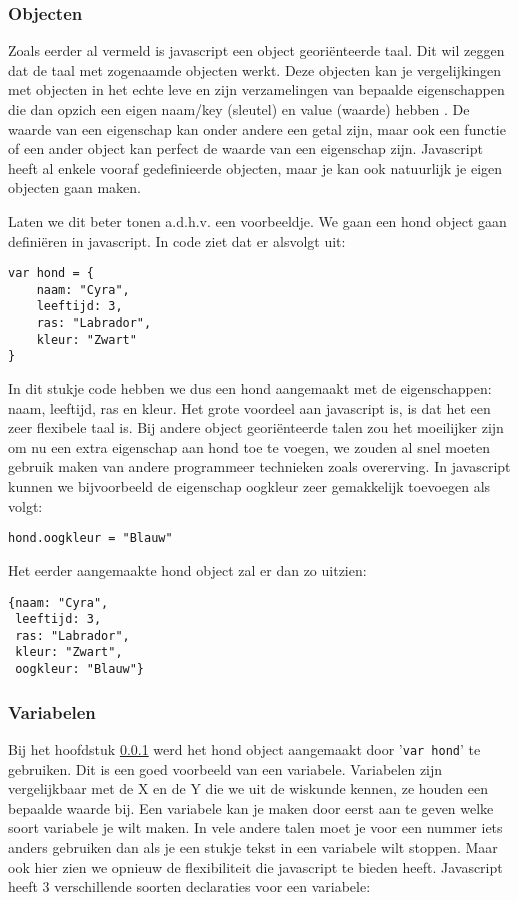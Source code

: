 \subsubsection{Objecten}
\label{sssec:objecten}
Zoals eerder al vermeld is javascript een object georiënteerde taal. Dit wil zeggen dat de taal met zogenaamde objecten werkt. Deze objecten kan je vergelijkingen met objecten in het echte leve en zijn verzamelingen van bepaalde eigenschappen die dan opzich een eigen naam/key (sleutel) en value (waarde) hebben \autocite{Mozilla2018}. De waarde van een eigenschap kan onder andere een getal zijn, maar ook een functie of een ander object kan perfect de waarde van een eigenschap zijn. Javascript heeft al enkele vooraf gedefinieerde objecten, maar je kan ook natuurlijk je eigen objecten gaan maken.

Laten we dit beter tonen a.d.h.v. een voorbeeldje. We gaan een hond object gaan definiëren in javascript. In code ziet dat er alsvolgt uit:

\begin{lstlisting}[frame=single]
var hond = {
	naam: "Cyra",
	leeftijd: 3,
	ras: "Labrador",
	kleur: "Zwart"
}
\end{lstlisting}

In dit stukje code hebben we dus een hond aangemaakt met de eigenschappen: naam, leeftijd, ras en kleur. Het grote voordeel aan javascript is, is dat het een zeer flexibele taal is. Bij andere object georiënteerde talen zou het moeilijker zijn om nu een extra eigenschap aan hond toe te voegen, we zouden al snel moeten gebruik maken van andere programmeer technieken zoals overerving. In javascript kunnen we bijvoorbeeld de eigenschap oogkleur zeer gemakkelijk toevoegen als volgt:

\begin{lstlisting}[frame=single]
hond.oogkleur = "Blauw"
\end{lstlisting}

Het eerder aangemaakte hond object zal er dan zo uitzien:

\begin{lstlisting}[frame=single]
{naam: "Cyra",
 leeftijd: 3,
 ras: "Labrador",
 kleur: "Zwart",
 oogkleur: "Blauw"}
\end{lstlisting}

\subsubsection{Variabelen}
\label{sssec:variabelen}
Bij het hoofdstuk \ref{sssec:objecten} werd het hond object aangemaakt door '\lstinline[basicstyle=\ttfamily\color{red}]|var hond|' te gebruiken. Dit is een goed voorbeeld van een variabele. Variabelen zijn vergelijkbaar met de X en de Y die we uit de wiskunde kennen, ze houden een bepaalde waarde bij. Een variabele kan je maken door eerst aan te geven welke soort variabele je wilt maken. In vele andere talen moet je voor een nummer iets anders gebruiken dan als je een stukje tekst in een variabele wilt stoppen. Maar ook hier zien we opnieuw de flexibiliteit die javascript te bieden heeft. Javascript heeft 3 verschillende soorten declaraties voor een variabele:


